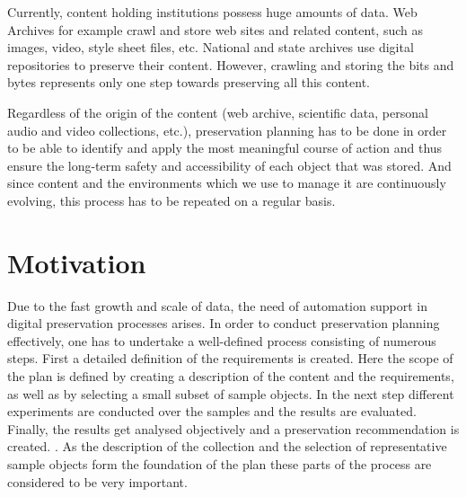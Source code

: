 Currently, content holding institutions possess huge amounts of data. Web Archives for example crawl and store web sites and related content, such as images, video, style sheet files, etc. National and state archives use digital repositories to preserve their content. However, crawling and storing the bits and bytes represents only one step towards preserving all this content.

Regardless of the origin of the content (web archive, scientific data, personal audio and video collections, etc.), preservation planning has to be done in order to be able to identify and apply the most meaningful course of action and thus ensure the long-term safety and accessibility of each object that was stored. And since content and the environments which we use to manage it are continuously evolving, this process has to be repeated on a regular basis.

\section{Motivation}
\label{sec:motivation}
Due to the fast growth and scale of data, the need of automation support in digital preservation processes arises. In order to conduct preservation planning effectively, one has to undertake a well-defined process consisting of numerous steps. First a detailed definition of the requirements is created. Here the scope of the plan is defined by creating a description of the content and the requirements, as well as by selecting a small subset of sample objects. In the next step different experiments are conducted over the samples and the results are evaluated. Finally, the results get analysed objectively and a preservation recommendation is created. \cite{Becker:2009fk}. As the description of the collection and the selection of representative sample objects form the foundation of the plan these parts of the process are considered to be very important.

